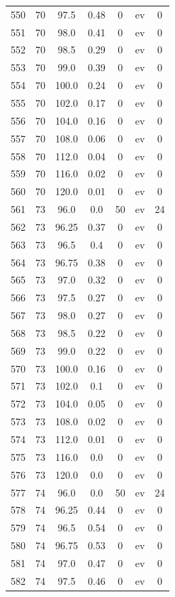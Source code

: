 \documentclass[12pt,a4paper]{article}
\begin{document}
\begin{tabular}{r|cccccc}
	550 & 70 & 97.5 & 0.48 & 0 & ev & 0 \\
	551 & 70 & 98.0 & 0.41 & 0 & ev & 0 \\
	552 & 70 & 98.5 & 0.29 & 0 & ev & 0 \\
	553 & 70 & 99.0 & 0.39 & 0 & ev & 0 \\
	554 & 70 & 100.0 & 0.24 & 0 & ev & 0 \\
	555 & 70 & 102.0 & 0.17 & 0 & ev & 0 \\
	556 & 70 & 104.0 & 0.16 & 0 & ev & 0 \\
	557 & 70 & 108.0 & 0.06 & 0 & ev & 0 \\
	558 & 70 & 112.0 & 0.04 & 0 & ev & 0 \\
	559 & 70 & 116.0 & 0.02 & 0 & ev & 0 \\
	560 & 70 & 120.0 & 0.01 & 0 & ev & 0 \\
	561 & 73 & 96.0 & 0.0 & 50 & ev & 24 \\
	562 & 73 & 96.25 & 0.37 & 0 & ev & 0 \\
	563 & 73 & 96.5 & 0.4 & 0 & ev & 0 \\
	564 & 73 & 96.75 & 0.38 & 0 & ev & 0 \\
	565 & 73 & 97.0 & 0.32 & 0 & ev & 0 \\
	566 & 73 & 97.5 & 0.27 & 0 & ev & 0 \\
	567 & 73 & 98.0 & 0.27 & 0 & ev & 0 \\
	568 & 73 & 98.5 & 0.22 & 0 & ev & 0 \\
	569 & 73 & 99.0 & 0.22 & 0 & ev & 0 \\
	570 & 73 & 100.0 & 0.16 & 0 & ev & 0 \\
	571 & 73 & 102.0 & 0.1 & 0 & ev & 0 \\
	572 & 73 & 104.0 & 0.05 & 0 & ev & 0 \\
	573 & 73 & 108.0 & 0.02 & 0 & ev & 0 \\
	574 & 73 & 112.0 & 0.01 & 0 & ev & 0 \\
	575 & 73 & 116.0 & 0.0 & 0 & ev & 0 \\
	576 & 73 & 120.0 & 0.0 & 0 & ev & 0 \\
	577 & 74 & 96.0 & 0.0 & 50 & ev & 24 \\
	578 & 74 & 96.25 & 0.44 & 0 & ev & 0 \\
	579 & 74 & 96.5 & 0.54 & 0 & ev & 0 \\
	580 & 74 & 96.75 & 0.53 & 0 & ev & 0 \\
	581 & 74 & 97.0 & 0.47 & 0 & ev & 0 \\
	582 & 74 & 97.5 & 0.46 & 0 & ev & 0 \\

\end{tabular}
\end{document}
